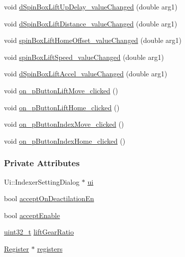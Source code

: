 \begin{DoxyCompactItemize}
void \mbox{\hyperlink{classIndexerSettingDialog_a596e2bdb49c0681bd06d847497d20cad}{d\+Spin\+Box\+Lift\+Up\+Delay\+\_\+value\+Changed}} (double arg1)
\item 
void \mbox{\hyperlink{classIndexerSettingDialog_a4cc32d94f2a3d8ed8cf99665f3d95d99}{d\+Spin\+Box\+Lift\+Distance\+\_\+value\+Changed}} (double arg1)
\item 
void \mbox{\hyperlink{classIndexerSettingDialog_a84a27fcd118a8208944a216cd88022c9}{spin\+Box\+Lift\+Home\+Offset\+\_\+value\+Changed}} (double arg1)
\item 
void \mbox{\hyperlink{classIndexerSettingDialog_a3632876be4c809b96b93d402044b3716}{spin\+Box\+Lift\+Speed\+\_\+value\+Changed}} (double arg1)
\item 
void \mbox{\hyperlink{classIndexerSettingDialog_a6a2a10523b6a1611763249e16bd65100}{d\+Spin\+Box\+Lift\+Accel\+\_\+value\+Changed}} (double arg1)
\item 
void \mbox{\hyperlink{classIndexerSettingDialog_ac0ae2808aaa375d27ca2caafe47c2c35}{on\+\_\+p\+Button\+Lift\+Move\+\_\+clicked}} ()
\item 
void \mbox{\hyperlink{classIndexerSettingDialog_a1dcf2f19ff38e28177ecad8f430af3c6}{on\+\_\+p\+Button\+Lift\+Home\+\_\+clicked}} ()
\item 
void \mbox{\hyperlink{classIndexerSettingDialog_a30f8761c69279bed9085dce50ec83422}{on\+\_\+p\+Button\+Index\+Move\+\_\+clicked}} ()
\item 
void \mbox{\hyperlink{classIndexerSettingDialog_a0d983ff2b43c6ad2d501a0c4e00d88e5}{on\+\_\+p\+Button\+Index\+Home\+\_\+clicked}} ()
\end{DoxyCompactItemize}
\subsubsection*{Private Attributes}
\begin{DoxyCompactItemize}
\item 
Ui\+::\+Indexer\+Setting\+Dialog $\ast$ \mbox{\hyperlink{classIndexerSettingDialog_ad5a0497f91a33e699cdbd912a6089776}{ui}}
\item 
bool \mbox{\hyperlink{classIndexerSettingDialog_aa781b93909330f9c60b4494555b39b4b}{accept\+On\+Deactilation\+En}}
\item 
bool \mbox{\hyperlink{classIndexerSettingDialog_a14a7ea545fca4efbe05799efe767f678}{accept\+Enable}}
\item 
\mbox{\hyperlink{settings_8h_a4196118492a3b1493c81f250e90af775}{uint32\+\_\+t}} \mbox{\hyperlink{classIndexerSettingDialog_a9dfafe2970aeba611a1736a3797cc3f3}{lift\+Gear\+Ratio}}
\item 
\mbox{\hyperlink{classRegister}{Register}} $\ast$ \mbox{\hyperlink{classIndexerSettingDialog_ab2298cdfcfc00f6472544041947209c3}{registers}}
\end{DoxyCompactItemize}


